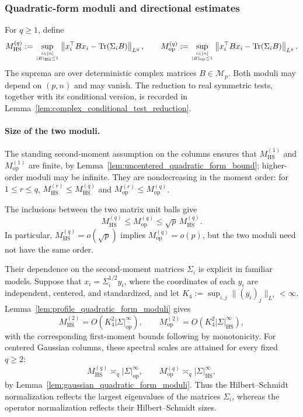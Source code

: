 \documentclass[EJP, preprint, NODS, nobera, nofontexpansion]{ejpecp}
\DeclareMathOperator{\op}{op}
\DeclareMathOperator{\tr}{Tr}
\DeclareMathOperator{\hs}{HS}
\begin{document}
\subsubsection{Quadratic-form moduli and directional estimates}
\label{sssec:main_quadratic_form_moduli} 
For $q\geq1$, define
\begin{align}\label{eq:def_M_hs_op_main}
    M_{\hs}^{(q)}
    :=
    \sup_{\genfrac{}{}{0pt}{2}{i\in[n]}{|B|_{\hs}\leq1}}
    \left\|x_i^\top Bx_i-\tr(\Sigma_iB)\right\|_{L^q},
    \qquad
    M_{\op}^{(q)}
    :=
    \sup_{\genfrac{}{}{0pt}{2}{i\in[n]}{|B|_{\op}\leq1}}
    \left\|x_i^\top Bx_i-\tr(\Sigma_iB)\right\|_{L^q}.
\end{align}
The suprema are over deterministic complex matrices $B\in\mathcal M_p$.
Both moduli may depend on $(p,n)$ and may vanish. The reduction to
real symmetric tests, together with its conditional version, is recorded
in Lemma~\ref{lem:complex_conditional_test_reduction}.

\paragraph{Size of the two moduli.}
The standing second-moment assumption on the columns ensures that
$M_{\hs}^{(1)}$ and $M_{\op}^{(1)}$ are finite, by
Lemma~\ref{lem:uncentered_quadratic_form_bound}; higher-order moduli
may be infinite. They are nondecreasing in the moment order:
for $1\leq r\leq q$, $M_{\hs}^{(r)}\leq M_{\hs}^{(q)}$ and $M_{\op}^{(r)}\leq M_{\op}^{(q)}$.

The inclusions between the two matrix unit balls give
\[
    M_{\hs}^{(q)}
    \leq M_{\op}^{(q)}
    \leq\sqrt p\,M_{\hs}^{(q)}.
\]
In particular, $M_{\hs}^{(q)}=o(\sqrt p)$ implies
$M_{\op}^{(q)}=o(p)$, but the two moduli need not have the same order.

Their dependence on the second-moment matrices $\Sigma_i$ is explicit
in familiar models. Suppose that $x_i=\Sigma_i^{1/2}y_i$, where
the coordinates of each $y_i$ are independent, centered, and
standardized, and let $K_4:=\sup_{i,j}\|(y_i)_j\|_{L^4}<\infty$. 
Lemma~\ref{lem:profile_quadratic_form_moduli} gives
\[
    M_{\hs}^{(2)}
    =O\!\left(K_4^2|\Sigma|_{\op}^\infty\right),
    \qquad
    M_{\op}^{(2)}
    =O\!\left(K_4^2|\Sigma|_{\hs}^\infty\right),
\]
with the corresponding first-moment bounds following by monotonicity.
For centered Gaussian columns, these spectral scales are attained
for every fixed $q\geq2$:
\[
    M_{\hs}^{(q)}\asymp_q|\Sigma|_{\op}^\infty,
    \qquad
    M_{\op}^{(q)}\asymp_q|\Sigma|_{\hs}^\infty,
\]
by Lemma~\ref{lem:gaussian_quadratic_form_moduli}. Thus the
Hilbert--Schmidt normalization reflects the largest eigenvalues of
the matrices $\Sigma_i$, whereas the operator normalization reflects
their Hilbert--Schmidt sizes.
\end{document}
